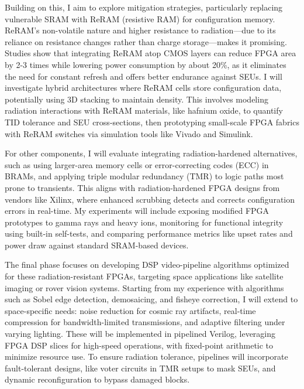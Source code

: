 \documentclass[a4paper,12pt]{article}
\begin{document}
\vspace{10pt}

Building on this, I aim to explore mitigation strategies, particularly replacing vulnerable SRAM with ReRAM (resistive RAM) for configuration memory. ReRAM's non-volatile nature and higher resistance to radiation—due to its reliance on resistance changes rather than charge storage—makes it promising. Studies show that integrating ReRAM atop CMOS layers can reduce FPGA area by 2-3 times while lowering power consumption by about 20\%, as it eliminates the need for constant refresh and offers better endurance against SEUs. I will investigate hybrid architectures where ReRAM cells store configuration data, potentially using 3D stacking to maintain density. This involves modeling radiation interactions with ReRAM materials, like hafnium oxide, to quantify TID tolerance and SEU cross-sections, then prototyping small-scale FPGA fabrics with ReRAM switches via simulation tools like Vivado and Simulink.

\vspace{10pt}

\newpage

For other components, I will evaluate integrating radiation-hardened alternatives, such as using larger-area memory cells or error-correcting codes (ECC) in BRAMs, and applying triple modular redundancy (TMR) to logic paths most prone to transients. This aligns with radiation-hardened FPGA designs from vendors like Xilinx, where enhanced scrubbing detects and corrects configuration errors in real-time. My experiments will include exposing modified FPGA prototypes to gamma rays and heavy ions, monitoring for functional integrity using built-in self-tests, and comparing performance metrics like upset rates and power draw against standard SRAM-based devices.

\vspace{10pt}

The final phase focuses on developing DSP video-pipeline algorithms optimized for these radiation-resistant FPGAs, targeting space applications like satellite imaging or rover vision systems. Starting from my experience with algorithms such as Sobel edge detection, demosaicing, and fisheye correction, I will extend to space-specific needs: noise reduction for cosmic ray artifacts, real-time compression for bandwidth-limited transmissions, and adaptive filtering under varying lighting. These will be implemented in pipelined Verilog, leveraging FPGA DSP slices for high-speed operations, with fixed-point arithmetic to minimize resource use. To ensure radiation tolerance, pipelines will incorporate fault-tolerant designs, like voter circuits in TMR setups to mask SEUs, and dynamic reconfiguration to bypass damaged blocks.
\end{document}
